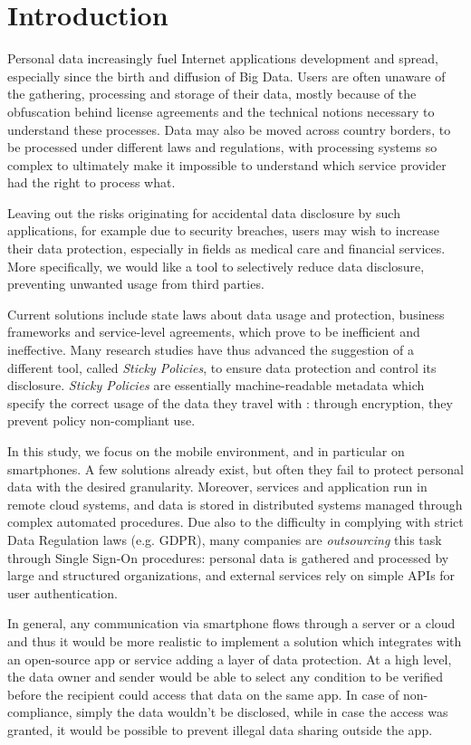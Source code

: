 \chapter{Introduction}
\label{Intro}
\thispagestyle{empty}

\noindent 
Personal data increasingly fuel Internet applications development and spread, especially since the birth and diffusion of Big Data. Users are often unaware of the gathering, processing and storage of their data, mostly because of the obfuscation behind license agreements and the technical notions necessary to understand these processes. Data may also be moved across country borders, to be processed under different laws and regulations, with processing systems so complex to ultimately make it impossible to understand which service provider had the right to process what.

Leaving out the risks originating for accidental data disclosure by such applications, for example due to security breaches, users may wish to increase their data protection, especially in fields as medical care and financial services. More specifically, we would like a tool to selectively reduce data disclosure, preventing unwanted usage from third parties.

Current solutions include state laws about data usage and protection, business frameworks and service-level agreements, which prove to be inefficient and ineffective. Many research studies have thus advanced the suggestion of a different tool, called \textit{Sticky Policies}, to ensure data protection and control its disclosure. \textit{Sticky Policies} are essentially machine-readable metadata which specify the correct usage of the data they travel with \cite{pearson2011sticky}: through encryption, they prevent policy non-compliant use.

In this study, we focus on the mobile environment, and in particular on smartphones. A few solutions already exist, but often they fail to protect personal data with the desired granularity. Moreover, services and application run in remote cloud systems, and data is stored in distributed systems managed through complex automated procedures. Due also to the difficulty in complying with strict Data Regulation laws (e.g. GDPR), many companies are \textit{outsourcing} this task through Single Sign-On procedures: personal data is gathered and processed by large and structured organizations, and external services rely on simple APIs for user authentication.

In general, any communication via smartphone flows through a server or a cloud and thus it would be more realistic to implement a solution which integrates with an open-source app or service adding a layer of data protection. At a high level, the data owner and sender would be able to select any condition to be verified before the recipient could access that data on the same app. In case of non-compliance, simply the data wouldn't be disclosed, while in case the access was granted, it would be possible to prevent illegal data sharing outside the app.

